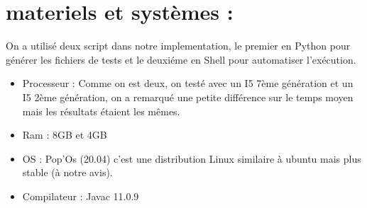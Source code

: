 \documentclass[oneside,13pt,a4paper]{article}
\begin{document}
\section{materiels et systèmes : }
On a utilisé deux script dans notre implementation, le premier en Python pour générer les fichiers de tests et le deuxiéme en Shell pour automatiser l'exécution.
\begin{itemize}
	\item Processeur : Comme on est deux, on testé avec un I5 7ème génération et un I5 2ème génération, on a remarqué une petite différence sur le temps moyen mais les résultats étaient les mêmes.
	\item Ram : 8GB et 4GB
	\item OS : Pop'Os (20.04) c'est une distribution Linux similaire à ubuntu mais plus stable (à notre avis).
	\item Compilateur : Javac 11.0.9
\end{itemize}
\end{document}
